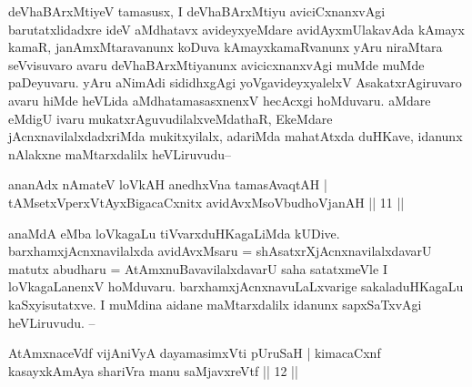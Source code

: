 
\begin{artha}
 deVhaBArxMtiyeV tamasusx, I deVhaBArxMtiyu aviciCxnanxvAgi barutatxlidadxre ideV aMdhatavx avideyxyeMdare avidAyxmUlakavAda kAmayx kamaR, janAmxMtaravanunx koDuva kAmayxkamaRvanunx yAru niraMtara seVvisuvaro avaru deVhaBArxMtiyanunx avicicxnanxvAgi muMde muMde paDeyuvaru. yAru aNimAdi sididhxgAgi yoVgavideyxyalelxV AsakatxrAgiruvaro avaru hiMde heVLida aMdhatamasasxnenxV hecAcxgi hoMduvaru. aMdare eMdigU ivaru mukatxrAguvudilalxveMdathaR, EkeMdare jAcnxnavilalxdadxriMda mukitxyilalx, adariMda mahatAtxda duHKave, idanunx nAlakxne maMtarxdalilx heVLiruvudu{\rm --} 
\end{artha}

\begin{shl}
ananAdx nAmateV loVkAH anedhxVna tamasAvaqtAH |\\
tAMsetxVperxVtAyxBigacaCxnitx avidAvxMsoV\s budhoVjanAH || 11 ||
\end{shl}

\begin{artha} %
anaMdA eMba loVkagaLu tiVvarxduHKagaLiMda kUDive. barxhamxjAcnxnavilalxda avidAvxMsaru = shAsatxrXjAcnxnavilalxdavarU matutx abudharu = AtAmxnuBavavilalxdavarU saha satatxmeVle I loVkagaLanenxV hoMduvaru. barxhamxjAcnxnavuLaLxvarige sakaladuHKagaLu kaSxyisutatxve. I muMdina aidane maMtarxdalilx idanunx sapxSaTxvAgi heVLiruvudu. {\rm --}
\end{artha}

\begin{shl}
AtAmxnaceVdf vijAniVyA dayamasimxVti pUruSaH |
kimacaCxnf kasayxkAmAya shariVra manu saMjavxreVtf || 12 ||
\end{shl}

